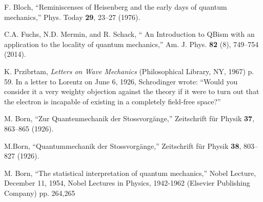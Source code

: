 \documentclass[prb,preprint]{revtex4-1}
\begin{document}
 

\begin{thebibliography}{99}



  F. Bloch, ``Reminiscenses of Heisenberg and the early days of quantum mechanics,''  
                            Phys. Today \textbf{29}, 23--27 (1976).

   C.A. Fuchs, N.D. Mermin, and R. Schack, `` An Introduction to QBism with an application to the locality of
                          quantum mechanics,'' Am. J. Phys. {\bf 82} (8), 749--754 (2014).                      
                            

    K. Przibrtam, {\it Letters on Wave Mechanics} (Philosophical Library, NY, 1967) p. 59.
                            In a letter to Lorentz on June 6, 1926, Schrodinger wrote: ``Would you consider it a very
                            weighty objection against the theory if it were to turn out that the electron is incapable 
                            of existing in a completely  field-free space?''

                            
  M. Born, ``Zur Quantenmechanik der Stossvorg\"{a}nge,''
                           Zeitschrift f\"{u}r Physik {\bf 37}, 863--865 (1926).

   M.Born, ``Quantummechanik der Stossvorg\"{a}nge,''
                              Zeitschrift f\"{u}r Physik {\bf 38}, 803--827 (1926). 

   M. Born, ``The statistical interpretation of quantum mechanics,''
                               Nobel Lecture, December 11, 1954, Nobel Lectures in Physics, 1942-1962 (Elsevier Publishing Company)  pp. 264,265
                               
\end{thebibliography}
\end{document}
